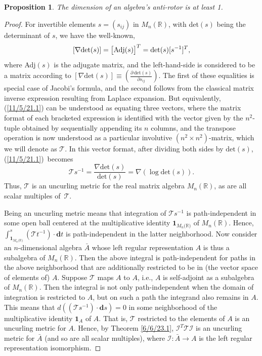 \documentclass{amsart}
\newtheorem{proposition}[theorem]{Proposition}
\theoremstyle{definition}
\numberwithin{theorem}{section}
\numberwithin{equation}{section}
\begin{document}
\begin{proposition}\label{6/11/25.1} The dimension of an algebra's anti-rotor is at least 1. \end{proposition} 
\begin{proof} For invertible elements $s = (s_{ij})$ in $M_n(\mathbb{R})$, with det$(s)$ being the determinant of $s$, we have the well-known,
  \begin{equation}\label{11/5/21.1}[\nabla \text{det}(s)] = \big[{\rm Adj}(s)\big]^T = \mbox{det}(s)[s^{-1}]^T,\end{equation} where Adj$(s)$ is the adjugate matrix, and the left-hand-side is considered to be a matrix according to $[\nabla \text{det}(s)]\equiv \left(\frac{\partial\,\text{det}(s)}{\partial s_{ij}}\right)$. The first of these equalities is special case of Jacobi's formula, and the second follows from the classical matrix inverse expression resulting from Laplace expansion. 
    But equivalently, (\ref{11/5/21.1}) can be understood as equating three vectors, where the matrix format of each bracketed expression is identified with the vector given by the \mbox{$n^2$-tuple} obtained by sequentially appending its $n$ columns, and the transpose operation is now understood as a particular involutive $(n^2\times n^2)$-matrix, which we will denote as $\mathcal{T}$.  In this vector format, after dividing both sides by $\text{det}(s)$, \mbox{(\ref{11/5/21.1}) becomes} \begin{equation}\label{6/11/25.2}\mathcal{T}s^{-1} = \frac{\nabla\text{det}(s)}{\text{det}(s)} = \nabla\left(\log \text{det}(s)\right).\end{equation}  Thus,  $\mathcal{T}$ is an uncurling metric for the real matrix algebra $M_n(\mathbb{R})$, as are all scalar multiples \mbox{of $\mathcal{T}$}. 
    

Being an uncurling metric means that integration of $\mathcal{T}s^{-1}$ is path-independent in some open ball centered at the multiplicative identity $\mathbf{1}_{M_n({\mathbb{R})}}$ of $M_n(\mathbb{R})$.  
 Hence, \mbox{$\int_{\mathbf{1}_{M_n({\mathbb{R})}}}^s (\mathcal{\mathcal{T}}t^{-1})\cdot \mathbf{d}t$} is path-independent in the latter neighborhood.  Now consider an $n$-dimensional algebra $\bar{A}$ whose left regular representation $A$ is thus a subalgebra of $M_n(\mathbb{R})$.  Then the above integral is path-independent for paths in the above neighborhood that are additionally restricted to be in (the vector space of elements of) $A$.  Suppose $\mathcal{T}$ maps $A$ to $A$, i.e., $A$ is self-adjoint as a subalgebra of $M_n(\mathbb{R})$. 
 Then the integral is not only path-independent when the domain of integration is restricted to $A$, but on such a path the integrand also remains in $A$.  This means that 
  $d((\mathcal{T}s^{-1})\cdot \mathbf{d}s) = 0$ in some neighborhood of the multiplicative identity $\mathbf{1}_A$ of $A$.  That is,  $\mathcal{T}$ restricted to the elements of $A$ is an uncurling metric for $A$.  Hence, by Theorem \ref{6/6/23.1}, $\mathcal{I}^T\mathcal{T}\mathcal{I}$ is an uncurling metric for $\bar{A}$ (and so are all scalar multiples), where $\mathcal{I}:\bar{A}\rightarrow A$ is the left regular representation isomorphism.  
  

\end{proof}
\end{document}
